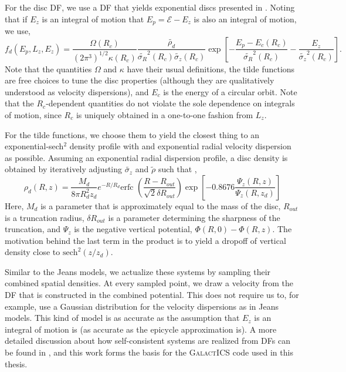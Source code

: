 For the disc DF, we use a DF that yields exponential discs presented in \citet{kd95galactics}. Noting that if $E_z$ is an integral of motion that $E_p = \mathcal{E} - E_z$ is also an integral of motion, we use,
\begin{equation}
f_d(E_p,L_z,E_z) = \frac{\Omega(R_c)}{(2 \pi^3)^{1/2} \kappa(R_c)} \frac{\tilde{\rho_d}}{\tilde{\sigma_R}^2(R_c) \tilde{\sigma_z}(R_c)} \exp\left[-\frac{E_p - E_c(R_c)}{\tilde{\sigma_R}^2(R_c)}  - \frac{E_z}{\tilde{\sigma_z}^2(R_c)}\right].
\end{equation}
Note that the quantities $\Omega$ and $\kappa$ have their usual definitions, the tilde functions are free choices to tune the disc properties (although they are qualitatively understood as velocity dispersions), and $E_c$ is the energy of a circular orbit. Note that the $R_c$-dependent quantities do not violate the sole dependence on integrals of motion, since $R_c$ is uniquely obtained in a one-to-one fashion from $L_z$.

For the tilde functions, we choose them to yield the closest thing to an exponential-sech$^2$ density profile with and exponential radial velocity dispersion as possible. Assuming an exponential radial dispersion profile, a disc density is obtained by iteratively adjusting $\tilde{\sigma_z}$ and $\tilde{\rho}$ such that \citep{kd95galactics},
\begin{equation}
\rho_d(R,z) = \frac{M_d}{8 \pi R_d^2 z_d} e^{-R/R_d} \text{erfc }\left(\frac{R - R_{out}}{\sqrt{2} \delta R_{out}}\right) \exp \left[ -0.8676 \frac{\Psi_z(R,z)}{\Psi_z(R,z_d)}\right]
\end{equation}
Here, $M_d$ is a parameter that is approximately equal to the mass of the disc, $R_{out}$ is a truncation radius, $\delta R_{out}$ is a parameter determining the sharpness of the truncation, and $\Psi_z$ is the negative vertical potential, $\Phi(R,0) - \Phi(R,z)$. The motivation behind the last term in the product is to yield a dropoff of vertical density close to $\text{sech}^2(z/z_d)$.

Similar to the  Jeans models, we actualize these systems by sampling their combined spatial densities. At every sampled point, we draw a velocity from the DF that is constructed in the combined potential. This does not require us to, for example, use a Gaussian distribution for the velocity dispersions as in Jeans models. This kind of model is as accurate as the assumption that $E_z$ is an integral of motion is (as accurate as the epicycle approximation is). A more detailed discussion about how self-consistent systems are realized from DFs can be found in \citet{kd95galactics}, and this work forms the basis for the \textsc{GalactICS} code used in this thesis.

